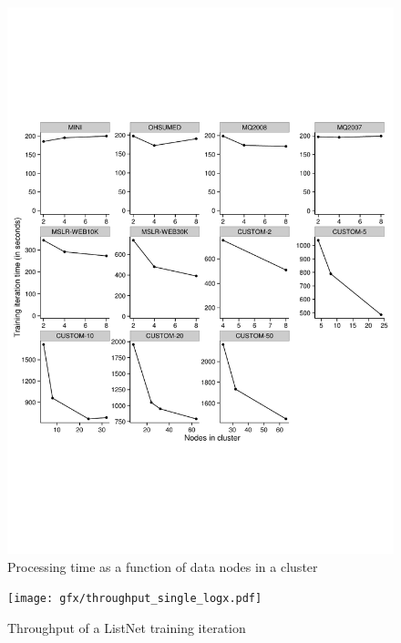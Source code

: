 \begin{figure}[!h]
\centering
\includegraphics[trim=0cm 5cm 0cm 5cm, scale=0.7]{gfx/speedup_faceted.pdf}
\caption{Processing time as a function of data nodes in a cluster}
\label{fig:speedup_train_time}
\end{figure}

\begin{figure}[!h]
\centering
\texttt{[image: gfx/throughput\_single\_logx.pdf]}
\caption{Throughput of a ListNet training iteration}
\label{fig:listnet_throughput}
\end{figure}